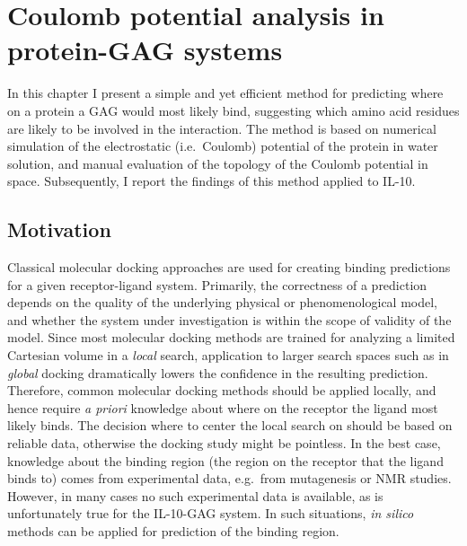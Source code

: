 \chapter{Coulomb potential analysis in protein-GAG systems}
\label{chapter:bspred}



In this chapter I present a simple and yet efficient method for predicting where
on a protein a GAG would most likely bind, suggesting which amino acid residues
are likely to be involved in the interaction. The method is based on numerical
simulation of the electrostatic (i.e.\ Coulomb) potential of the protein in
water solution, and manual evaluation of the topology of the Coulomb potential
in space. Subsequently, I report the findings of this method applied to IL-10.

\section{Motivation}
\label{bspred:motivation}

Classical molecular docking approaches are used for creating binding predictions
for a given receptor-ligand system. Primarily, the correctness of a prediction
depends on the quality of the underlying physical or phenomenological model, and
whether the system under investigation is within the scope of validity of the
model. Since most molecular docking methods are trained for analyzing a limited
Cartesian volume in a \textit{local} search, application to larger search spaces
such as in \textit{global} docking dramatically lowers the confidence in the
resulting prediction. Therefore, common molecular docking methods should be
applied locally, and hence require \textit{a priori} knowledge about where on
the receptor the ligand most likely binds. The decision where to center the
local search on should be based on reliable data, otherwise the docking study
might be pointless. In the best case, knowledge about the binding region (the
region on the receptor that the ligand binds to) comes from experimental data,
e.g.\ from mutagenesis or NMR studies. However, in many cases no such
experimental data is available, as is unfortunately true for the IL-10-GAG
system. In such situations, \textit{in silico} methods can be applied for
prediction of the binding region.

